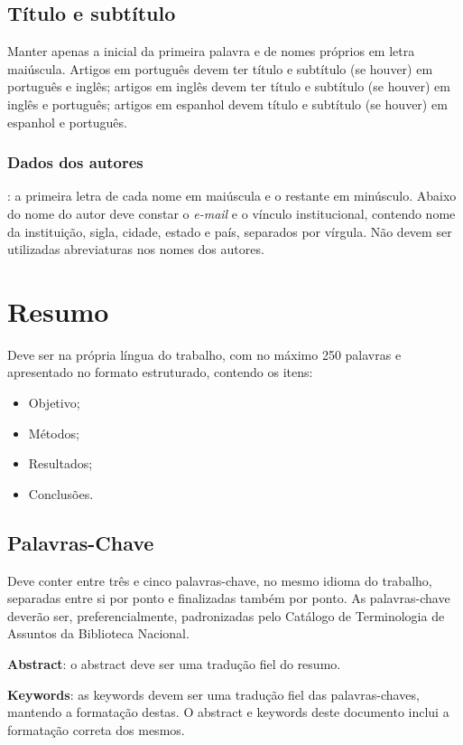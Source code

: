 \documentclass{modelo}
\begin{document}
\subsection{Título e subtítulo} 
Manter apenas a inicial da primeira palavra e de nomes próprios em letra maiúscula. Artigos em português devem ter título e subtítulo (se houver) em português e inglês; artigos em inglês devem ter título e subtítulo (se houver) em inglês e português; artigos em espanhol devem título e subtítulo (se houver) em espanhol e português.

\subsubsection{Dados dos autores}: a primeira letra de cada nome em maiúscula e o restante em minúsculo. Abaixo do nome do autor deve constar o \textit{e-mail} e o vínculo institucional, contendo nome da instituição, sigla, cidade, estado e país, separados por vírgula. Não devem ser utilizadas abreviaturas nos nomes dos autores. 

\section{Resumo} 
Deve ser na própria língua do trabalho, com no máximo 250 palavras e apresentado no formato estruturado, contendo os itens:  
\begin{itemize}
	\item Objetivo; 
	\item Métodos;
	\item Resultados; 
	\item Conclusões.
\end{itemize}

\subsection{Palavras-Chave}  
Deve conter entre três e cinco palavras-chave, no mesmo idioma do trabalho, separadas entre si por ponto e finalizadas também por ponto. As palavras-chave deverão ser, preferencialmente, padronizadas pelo Catálogo de Terminologia de Assuntos da Biblioteca Nacional. 
 
\textbf{Abstract}: o abstract deve ser uma tradução fiel do resumo.
 
\textbf{Keywords}: as keywords devem ser uma tradução fiel das palavras-chaves, mantendo a formatação destas. O abstract e keywords deste documento inclui a formatação correta dos mesmos. 
\end{document}
